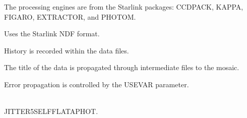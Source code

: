 \documentclass[twoside,11pt]{article}
\newcommand{\xref}[3]{#1}
\renewcommand{\_}{\texttt{\symbol{95}}}
\newcommand{\CCDPACK}{{\footnotesize CCDPACK}}
\newcommand{\EXTRACTOR}{\mbox{\footnotesize EXTRACTOR}}
\newcommand{\FIGARO}{\mbox{\footnotesize FIGARO}}
\newcommand{\KAPPA}{{\footnotesize KAPPA}}
\newcommand{\PHOTOM}{{\footnotesize PHOTOM}}
\newcommand{\sstdiytopic}[2]{\goodbreak \item[{\hspace{-0.35em}#1\hspace{-0.35em}:}] \mbox{} \\[1.3ex] #2}
\newcommand{\sstitem}{\item}
\newcommand{\sstdiytopic}[2]{\item[{#1}:]
      \begin{description}
         #2
      \end{description}
      \\
   }
\begin{document}
{{{         \sstitem
         The processing engines are from the Starlink packages: \xref{\CCDPACK}{sun139}{},
         \xref{\KAPPA}{sun95}{}, \xref{\FIGARO}{sun86}{},
         \xref{\EXTRACTOR}{sun226}{}, and \xref{\PHOTOM}{sun45}{}.

         \sstitem
         Uses the Starlink NDF format.

         \sstitem
         History is recorded within the data files.

         \sstitem
         The title of the data is propagated through intermediate files
         to the mosaic.

         \sstitem
         Error propagation is controlled by the USEVAR parameter.
      }
   }
   \sstdiytopic{
      Deprecated Variants
   }{
      JITTER5\_SELF\_FLAT\_APHOT.
   }
}
\end{document}
